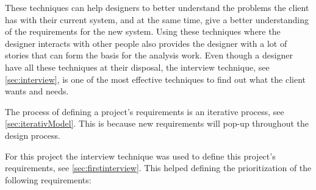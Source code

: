 These techniques can help designers to better understand the problems the client has with their current system, and at the same time, give a better understanding of the requirements for the new system.
Using these techniques where the designer interacts with other people also provides the designer with a lot of stories that can form the basis for the analysis work. 
Even though a designer have all these techniques at their disposal, the interview technique, see \cref{sec:interview}, is one of the most effective techniques to find out what the client wants and needs.

The process of defining a project's requirements is an iterative process, see \cref{sec:iterativModel}. 
This is because new requirements will pop-up throughout the design process.

For this project the interview technique was used to define this project's requirements, see \cref{sec:firstinterview}. This helped defining the prioritization of the following requirements:

